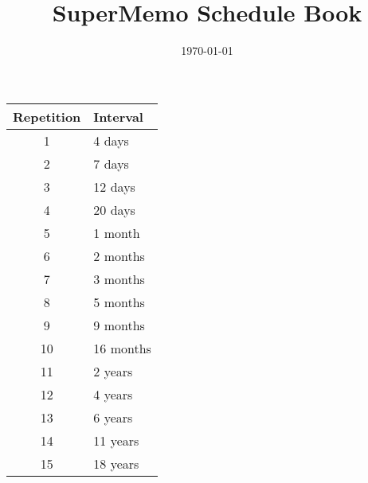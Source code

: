 \documentclass{article}
\newcommand\T{\rule{0pt}{2.6ex}}       %
\newcommand\B{\rule[-1.2ex]{0pt}{0pt}} %
\begin{document}
\title{SuperMemo Schedule Book}
\date{\today}
\maketitle

\begin{center}
\begin{tabular}{|c|l|}\hline
\textbf{Repetition} & \textbf{Interval} \\ \hline
\T\B 1 & 4 days \\ \hline
\T\B 2 & 7 days \\ \hline
\T\B 3 & 12 days \\ \hline
\T\B 4 & 20 days \\ \hline
\T\B 5 & 1 month \\ \hline
\T\B 6 & 2 months \\ \hline
\T\B 7 & 3 months \\ \hline
\T\B 8 & 5 months \\ \hline
\T\B 9 & 9 months \\ \hline
\T\B 10 & 16 months \\ \hline
\T\B 11 & 2 years \\ \hline
\T\B 12 & 4 years \\ \hline
\T\B 13 & 6 years \\ \hline
\T\B 14 & 11 years \\ \hline
\T\B 15 & 18 years \\ \hline
\end{tabular}
\end{center}


\end{document}
